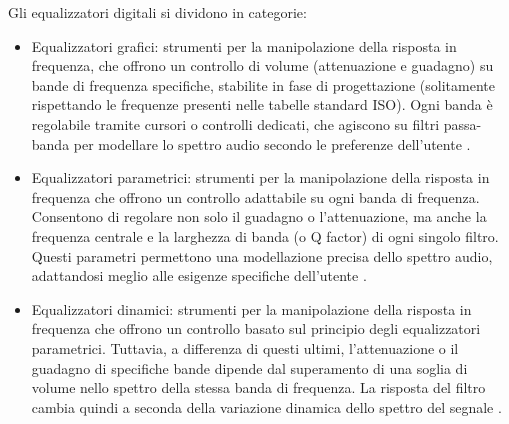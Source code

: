 \documentclass[12pt]{report}
\begin{document}
Gli equalizzatori digitali si dividono in categorie:
\begin{itemize}
    \item Equalizzatori grafici: strumenti per la manipolazione della risposta in frequenza, che offrono un controllo di volume (attenuazione e guadagno) su bande di frequenza specifiche, stabilite in fase di progettazione (solitamente rispettando le frequenze presenti nelle tabelle standard ISO). Ogni banda è regolabile tramite cursori o controlli dedicati, che agiscono su filtri passa-banda per modellare lo spettro audio secondo le preferenze dell'utente \parencite{liski2017quest}.
    \item Equalizzatori parametrici: strumenti per la manipolazione della risposta in frequenza che offrono un controllo adattabile su ogni banda di frequenza. Consentono di regolare non solo il guadagno o l'attenuazione, ma anche la frequenza centrale e la larghezza di banda (o Q factor) di ogni singolo filtro. Questi parametri permettono una modellazione precisa dello spettro audio, adattandosi meglio alle esigenze specifiche dell'utente \parencite{massenburg1972parametric}.
    \item Equalizzatori dinamici: strumenti per la manipolazione della risposta in frequenza che offrono un controllo basato sul principio degli equalizzatori parametrici. Tuttavia, a differenza di questi ultimi, l'attenuazione o il guadagno di specifiche bande dipende dal superamento di una soglia di volume nello spettro della stessa banda di frequenza. La risposta del filtro cambia quindi a seconda della variazione dinamica dello spettro del segnale \parencite{martignon2023dynamic}.
\end{itemize}
\end{document}
